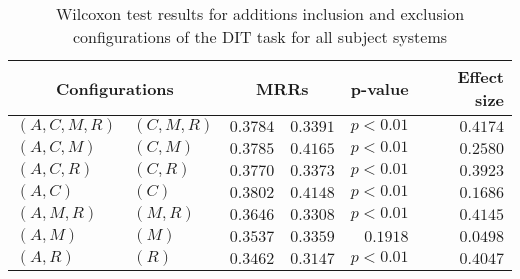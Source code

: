 
\begin{table}
\begin{spacing}{1.2}
\centering
\caption{Wilcoxon test results for additions inclusion and exclusion configurations of the DIT task for all subject systems}
\label{table:versus-wilcox-all-dit-additions}
\begin{tabular}{ll|rr|rr}
\toprule
      \multicolumn{2}{c|}{Configurations} &          \multicolumn{2}{c|}{MRRs} &       p-value & Effect size \\
\midrule
 $(A,C,M,R)$ &  $(C,M,R)$ & $0.3784$ & $0.3391$ & $p<0.01$ &    $0.4174$ \\
   $(A,C,M)$ &    $(C,M)$ & $0.3785$ & $0.4165$ & $p<0.01$ &    $0.2580$ \\
   $(A,C,R)$ &    $(C,R)$ & $0.3770$ & $0.3373$ & $p<0.01$ &    $0.3923$ \\
     $(A,C)$ &      $(C)$ & $0.3802$ & $0.4148$ & $p<0.01$ &    $0.1686$ \\
   $(A,M,R)$ &    $(M,R)$ & $0.3646$ & $0.3308$ & $p<0.01$ &    $0.4145$ \\
     $(A,M)$ &      $(M)$ & $0.3537$ & $0.3359$ & $0.1918$ &    $0.0498$ \\
     $(A,R)$ &      $(R)$ & $0.3462$ & $0.3147$ & $p<0.01$ &    $0.4047$ \\
\bottomrule
\end{tabular}

\end{spacing}
\end{table}

